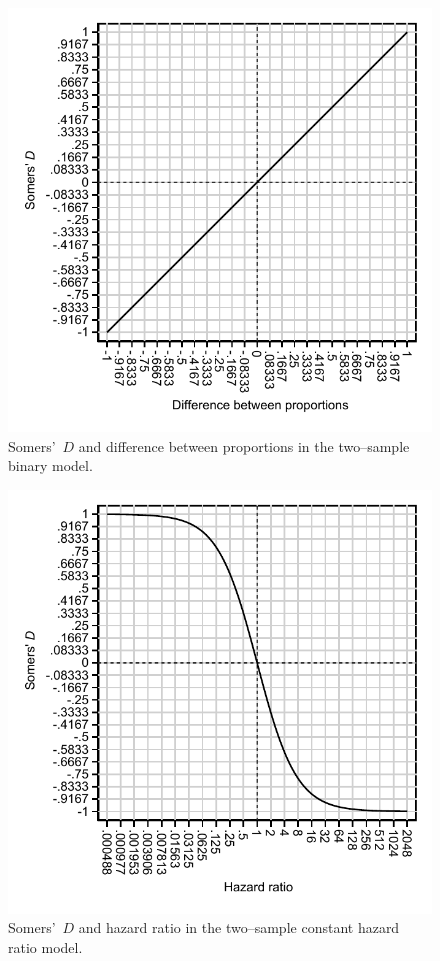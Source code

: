 \documentclass[a4paper,notitlepage]{article}      %
\begin{document}
\begin{figure}[htbp]
\caption{Somers'~$D$ and difference between proportions in the two--sample binary model.}
\label{figure:figseq1}
\includegraphics{diffprop.pdf}
\end{figure}

\begin{figure}[htbp]
\caption{Somers'~$D$ and hazard ratio in the two--sample constant hazard ratio model.}
\label{figure:figseq2}
\includegraphics{hazrat.pdf}
\end{figure}
\end{document}
